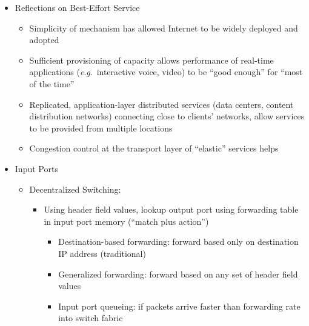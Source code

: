 \begin{itemize}
\begin{itemize}
\begin{enumerate}
        \end{enumerate}

    \end{itemize}
    
  \item Reflections on Best-Effort Service

    \begin{itemize}

      \item Simplicity of mechanism has allowed Internet to be widely deployed and adopted

      \item Sufficient provisioning of capacity allows performance of real-time applications (\textit{e}.\textit{g}.\ interactive voice, video) to be ``good enough'' for ``most of the time''

      \item Replicated, application-layer distributed services (data centers, content distribution networks) connecting close to clients' networks, allow services to be provided from multiple locations

      \item Congestion control at the transport layer of ``elastic'' services helps

    \end{itemize}

  \item Input Ports

    \begin{itemize}

      \item Decentralized Switching:

        \begin{itemize}

          \item Using header field values, lookup output port using forwarding table in input port memory (``match plus action'')

            \begin{itemize}

              \item Destination-based forwarding: forward based only on destination IP address (traditional)

              \item Generalized forwarding: forward based on any set of header field values

              \item Input port queueing: if packets arrive faster than forwarding rate into switch fabric


\end{itemize}
\end{itemize}
\end{itemize}
\end{itemize}
